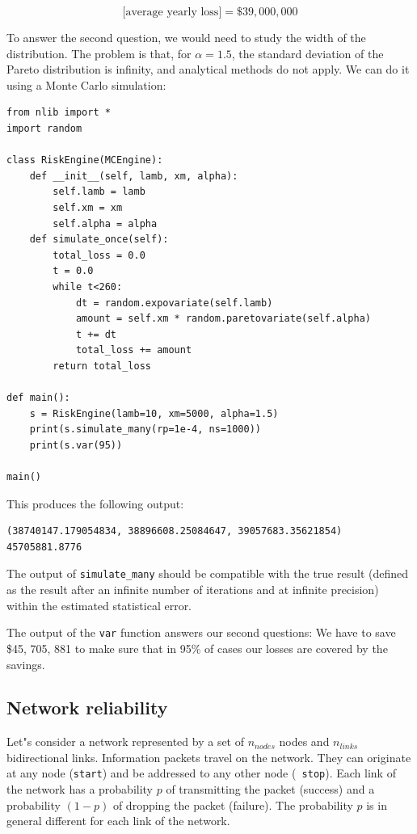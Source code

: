 \documentclass[justified, sixbynine]{tufte-book}
\def\ft{\small\tt}
\theoremstyle{plain}%
\newtheorem * {corollary}{Corollary}
\theoremstyle{definition}
\theoremstyle{remark}
\newtheorem * {remark}{Remark}
\newtheorem * {note}{Note}
\begin{document}
\begin{fullwidth}
\begin{equation}
\textrm{[average yearly loss]} = \$39, 000, 000
\end{equation}

To answer the second question, we would need to study the width of the distribution. The problem is that, for $\alpha=1.5$, the standard deviation of the Pareto distribution is infinity, and analytical methods do not apply. We can do it using a Monte Carlo simulation:


\begin{lstlisting}[caption={in file: {\ft risk.py}}]
from nlib import * 
import random

class RiskEngine(MCEngine):
    def __init__(self, lamb, xm, alpha):
        self.lamb = lamb
        self.xm = xm
        self.alpha = alpha
    def simulate_once(self):
        total_loss = 0.0
        t = 0.0
        while t<260:
            dt = random.expovariate(self.lamb)
            amount = self.xm * random.paretovariate(self.alpha)
            t += dt
            total_loss += amount
        return total_loss

def main():
    s = RiskEngine(lamb=10, xm=5000, alpha=1.5)
    print(s.simulate_many(rp=1e-4, ns=1000))
    print(s.var(95))

main()
\end{lstlisting}

This produces the following output:

\begin{lstlisting}
(38740147.179054834, 38896608.25084647, 39057683.35621854)
45705881.8776
\end{lstlisting}

The output of {\ft simulate\_many} should be compatible with the true result (defined as the result after an infinite number of iterations and at infinite precision) within the estimated statistical error.

The output of the {\ft var} function answers our second questions: We have to save \$45, 705, 881 to make sure that in 95\% of cases our losses are covered by the savings.


\subsection{Network reliability}

Let"s consider a network represented by a set of $n_{nodes}$ nodes and $%
n_{links}$ bidirectional links. Information
packets travel on the network. They can
originate at any node ({\ft start}) and be addressed to any other node ({\ft %
stop}). Each link of the network has a probability $p$ of transmitting the
packet (success) and a probability $(1-p)$ of dropping the packet (failure).
The probability $p$ is in general different for each link of the network.


\end{fullwidth}
\end{document}
